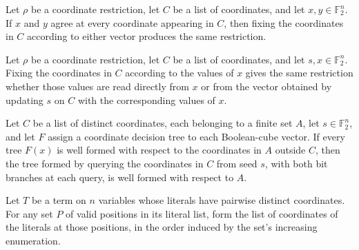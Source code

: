 \begin{theorem}
\label{FABL.CoordinateDecisionTree.fixCoordinateList_congr}
\leanok
{}
Let $\rho$ be a coordinate restriction, let $C$ be a list of coordinates, and let
$x,y\in\mathbb{F}_2^n$. If $x$ and $y$ agree at every coordinate appearing in $C$, then
fixing the coordinates in $C$ according to either vector produces the same restriction.
\end{theorem}

\begin{theorem}
\label{FABL.CoordinateDecisionTree.fixCoordinateList_assignCoordinates}
\leanok
{}
Let $\rho$ be a coordinate restriction, let $C$ be a list of coordinates, and let
$s,x\in\mathbb{F}_2^n$. Fixing the coordinates in $C$ according to the values of $x$
gives the same restriction whether those values are read directly from $x$ or from the
vector obtained by updating $s$ on $C$ with the corresponding values of $x$.
\end{theorem}

\begin{theorem}
\label{FABL.CoordinateDecisionTree.wellFormed_queryCoordinates}
\leanok
{}
Let $C$ be a list of distinct coordinates, each belonging to a finite set $A$, let
$s\in\mathbb{F}_2^n$, and let $F$ assign a coordinate decision tree to each Boolean-cube
vector. If every tree $F(x)$ is well formed with respect to the coordinates in $A$
outside $C$, then the tree formed by querying the coordinates in $C$ from seed $s$, with
both bit branches at each query, is well formed with respect to $A$.
\end{theorem}

\begin{definition}
\label{FABL.DNFTerm.coordinatesAtPositions}
\leanok
{}
Let $T$ be a term on $n$ variables whose literals have pairwise distinct coordinates.
For any set $P$ of valid positions in its literal list, form the list of coordinates of
the literals at those positions, in the order induced by the set's increasing
enumeration.
\end{definition}

